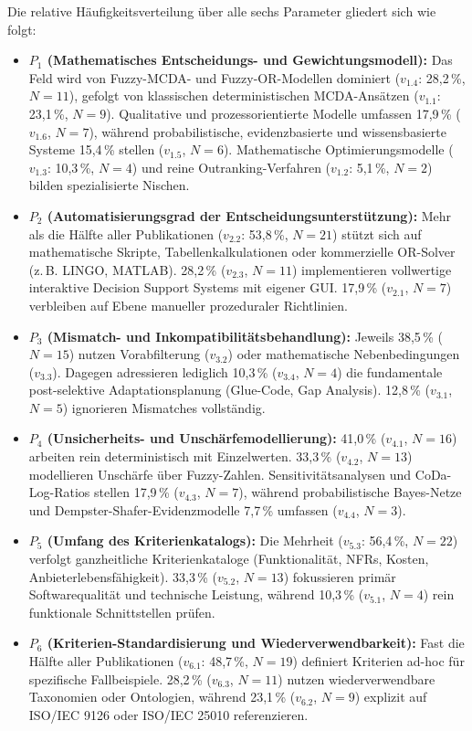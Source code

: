 Die relative Häufigkeitsverteilung über alle sechs Parameter gliedert sich wie folgt:
\begin{itemize}[leftmargin=*]
  \item \textbf{$P_1$ (Mathematisches Entscheidungs- und Gewichtungsmodell):} Das Feld wird von Fuzzy-MCDA- und Fuzzy-OR-Modellen dominiert ($v_{1.4}$: 28,2\,\%, $N = 11$), gefolgt von klassischen deterministischen MCDA-Ansätzen ($v_{1.1}$: 23,1\,\%, $N = 9$). Qualitative und prozessorientierte Modelle umfassen 17,9\,\% ($v_{1.6}$, $N = 7$), während probabilistische, evidenzbasierte und wissensbasierte Systeme 15,4\,\% stellen ($v_{1.5}$, $N = 6$). Mathematische Optimierungsmodelle ($v_{1.3}$: 10,3\,\%, $N = 4$) und reine Outranking-Verfahren ($v_{1.2}$: 5,1\,\%, $N = 2$) bilden spezialisierte Nischen.
  \item \textbf{$P_2$ (Automatisierungsgrad der Entscheidungsunterstützung):} Mehr als die Hälfte aller Publikationen ($v_{2.2}$: 53,8\,\%, $N = 21$) stützt sich auf mathematische Skripte, Tabellenkalkulationen oder kommerzielle OR-Solver (z.\,B. LINGO, MATLAB). 28,2\,\% ($v_{2.3}$, $N = 11$) implementieren vollwertige interaktive Decision Support Systems mit eigener GUI. 17,9\,\% ($v_{2.1}$, $N = 7$) verbleiben auf Ebene manueller prozeduraler Richtlinien.
  \item \textbf{$P_3$ (Mismatch- und Inkompatibilitätsbehandlung):} Jeweils 38,5\,\% ($N = 15$) nutzen Vorabfilterung ($v_{3.2}$) oder mathematische Nebenbedingungen ($v_{3.3}$). Dagegen adressieren lediglich 10,3\,\% ($v_{3.4}$, $N = 4$) die fundamentale post-selektive Adaptationsplanung (Glue-Code, Gap Analysis). 12,8\,\% ($v_{3.1}$, $N = 5$) ignorieren Mismatches vollständig.
  \item \textbf{$P_4$ (Unsicherheits- und Unschärfemodellierung):} 41,0\,\% ($v_{4.1}$, $N = 16$) arbeiten rein deterministisch mit Einzelwerten. 33,3\,\% ($v_{4.2}$, $N = 13$) modellieren Unschärfe über Fuzzy-Zahlen. Sensitivitätsanalysen und CoDa-Log-Ratios stellen 17,9\,\% ($v_{4.3}$, $N = 7$), während probabilistische Bayes-Netze und Dempster-Shafer-Evidenzmodelle 7,7\,\% umfassen ($v_{4.4}$, $N = 3$).
  \item \textbf{$P_5$ (Umfang des Kriterienkatalogs):} Die Mehrheit ($v_{5.3}$: 56,4\,\%, $N = 22$) verfolgt ganzheitliche Kriterienkataloge (Funktionalität, NFRs, Kosten, Anbieterlebensfähigkeit). 33,3\,\% ($v_{5.2}$, $N = 13$) fokussieren primär Softwarequalität und technische Leistung, während 10,3\,\% ($v_{5.1}$, $N = 4$) rein funktionale Schnittstellen prüfen.
  \item \textbf{$P_6$ (Kriterien-Standardisierung und Wiederverwendbarkeit):} Fast die Hälfte aller Publikationen ($v_{6.1}$: 48,7\,\%, $N = 19$) definiert Kriterien ad-hoc für spezifische Fallbeispiele. 28,2\,\% ($v_{6.3}$, $N = 11$) nutzen wiederverwendbare Taxonomien oder Ontologien, während 23,1\,\% ($v_{6.2}$, $N = 9$) explizit auf ISO/IEC 9126 oder ISO/IEC 25010 referenzieren.
\end{itemize}


